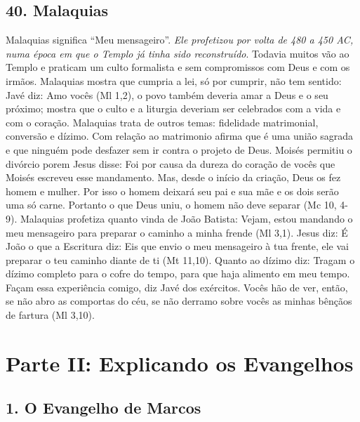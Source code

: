 \documentclass[
]{book}
\begin{document}
\hypertarget{malaquias}{%
\section*{40. Malaquias}\label{malaquias}}

Malaquias significa ``Meu mensageiro''. \emph{Ele profetizou por volta de 480 a 450 AC, numa época em que o Templo já tinha sido reconstruído}. Todavia muitos vão ao Templo e praticam um culto formalista e sem compromissos com Deus e com os irmãos. Malaquias mostra que cumpria a lei, só por cumprir, não tem sentido: Javé diz: Amo vocês (Ml 1,2), o povo também deveria amar a Deus e o seu próximo; mostra que o culto e a liturgia deveriam ser celebrados com a vida e com o coração. Malaquias trata de outros temas: fidelidade matrimonial, conversão e dízimo. Com relação ao matrimonio afirma que é uma união sagrada e que ninguém pode desfazer sem ir contra o projeto de Deus. Moisés permitiu o divórcio porem Jesus disse: Foi por causa da dureza do coração de vocês que Moisés escreveu esse mandamento. Mas, desde o início da criação, Deus os fez homem e mulher. Por isso o homem deixará seu pai e sua mãe e os dois serão uma só carne. Portanto o que Deus uniu, o homem não deve separar (Mc 10, 4-9). Malaquias profetiza quanto vinda de João Batista: Vejam, estou mandando o meu mensageiro para preparar o caminho a minha frende (Ml 3,1). Jesus diz: É João o que a Escritura diz: Eis que envio o meu mensageiro à tua frente, ele vai preparar o teu caminho diante de ti (Mt 11,10). Quanto ao dízimo diz: Tragam o dízimo completo para o cofre do tempo, para que haja alimento em meu tempo. Façam essa experiência comigo, diz Javé dos exércitos. Vocês hão de ver, então, se não abro as comportas do céu, se não derramo sobre vocês as minhas bênçãos de fartura (Ml 3,10).

\hypertarget{parte-ii-explicando-os-evangelhos}{%
\chapter*{Parte II: Explicando os Evangelhos}\label{parte-ii-explicando-os-evangelhos}}

\hypertarget{o-evangelho-de-marcos}{%
\section*{1. O Evangelho de Marcos}\label{o-evangelho-de-marcos}}
\end{document}
